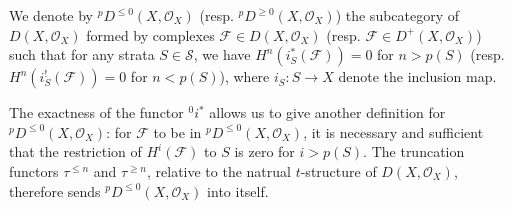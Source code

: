 \begin{definition}
We denote by ${^pD^{\leq 0}}(X,\mathscr{O}_X)$ (resp. ${^pD^{\geq 0}}(X,\mathscr{O}_X)$) the subcategory of $D(X,\mathscr{O}_X)$ formed by complexes $\mathscr{F}\in D(X,\mathscr{O}_X)$ (resp. $\mathscr{F}\in D^+(X,\mathscr{O}_X)$) such that for any strata $S\in\mathcal{S}$, we have $H^n(i_S^*(\mathscr{F}))=0$ for $n>p(S)$ (resp. $H^n(i_S^!(\mathscr{F}))=0$ for $n<p(S)$), where $i_S:S\to X$ denote the inclusion map.
\end{definition}

The exactness of the functor ${^0i^*}$ allows us to give another definition for ${^pD^{\leq 0}(X,\mathscr{O}_X)}$: for $\mathscr{F}$ to be in ${^pD^{\leq 0}}(X,\mathscr{O}_X)$, it is necessary and sufficient that the restriction of $H^i(\mathscr{F})$ to $S$ is zero for $i>p(S)$. The truncation functors $\tau^{\leq n}$ and $\tau^{\geq n}$, relative to the natrual $t$-structure of $D(X,\mathscr{O}_X)$, therefore sends ${^pD^{\leq 0}}(X,\mathscr{O}_X)$ into itself.


